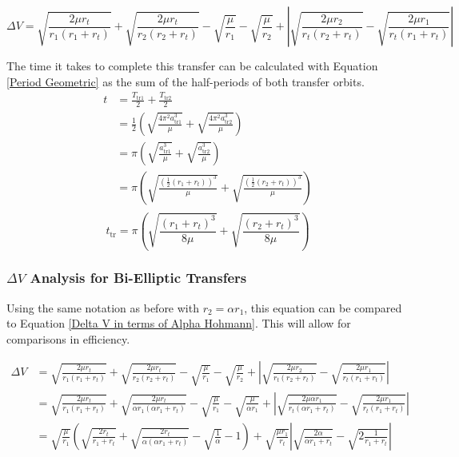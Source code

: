 \documentclass[../main.tex]{subfiles}
\begin{document}
\begin{equation}
    \Delta V = \sqrt{\frac{2\mu r_t}{r_1(r_1+r_t)}}+\sqrt{\frac{2\mu r_t}{r_2(r_2+r_t)}}-\sqrt{\frac{\mu}{r_1}}-\sqrt{\frac{\mu}{r_2}}+\left|\sqrt{\frac{2\mu r_2}{r_t(r_2+r_t)}}-\sqrt{\frac{2\mu r_1}{r_t(r_1+r_t)}}\right|
\end{equation}

The time it takes to complete this transfer can be calculated with Equation \eqref{Period Geometric} as the sum of the half-periods of both transfer orbits.
\begin{align*}
    t & =\frac{T_\text{tr1}}{2}+\frac{T_\text{tr2}}{2}                                                             \\
      & =\frac{1}{2}\left(\sqrt{\frac{4\pi^2 a_\text{tr1}^3}{\mu}}+\sqrt{\frac{4\pi^2 a_\text{tr2}^3}{\mu}}\right) \\
      & =\pi\left(\sqrt{\frac{a_\text{tr1}^3}{\mu}}+\sqrt{\frac{a_\text{tr2}^3}{\mu}}\right)                       \\
      & =\pi\left(\sqrt{\frac{(\frac{1}{2}(r_1+r_t))^3}{\mu}}+\sqrt{\frac{(\frac{1}{2}(r_2+r_t))^3}{\mu}}\right)   \\
\end{align*}
\begin{equation}\label{Bielliptic time}
    t_\text{tr}=\pi\left(\sqrt{\frac{(r_1+r_t)^3}{8\mu}}+\sqrt{\frac{(r_2+r_t)^3}{8\mu}}\right)
\end{equation}

\subsubsection{\texorpdfstring{$\Delta V$}{DeltaV} Analysis for Bi-Elliptic Transfers}

Using the same notation as before with $r_2=\alpha r_1$, this equation can be compared to Equation \eqref{Delta V in terms of Alpha Hohmann}. This will allow for comparisons in efficiency.

\begin{align*}
    \Delta V & = \sqrt{\frac{2\mu r_t}{r_1(r_1+r_t)}}+\sqrt{\frac{2\mu r_t}{r_2(r_2+r_t)}}-\sqrt{\frac{\mu}{r_1}}-\sqrt{\frac{\mu}{r_2}}+\left|\sqrt{\frac{2\mu r_2}{r_t(r_2+r_t)}}-\sqrt{\frac{2\mu r_1}{r_t(r_1+r_t)}}\right|                                    \\
             & = \sqrt{\frac{2\mu r_t}{r_1(r_1+r_t)}}+\sqrt{\frac{2\mu r_t}{\alpha r_1(\alpha r_1+r_t)}}-\sqrt{\frac{\mu}{r_1}}-\sqrt{\frac{\mu}{\alpha r_1}}+\left|\sqrt{\frac{2\mu \alpha r_1}{r_t(\alpha r_1+r_t)}}-\sqrt{\frac{2\mu r_1}{r_t(r_1+r_t)}}\right| \\
             & = \sqrt{\frac{\mu}{r_1}}\left(\sqrt{\frac{2r_t}{r_1+r_t}}+\sqrt{\frac{2r_t}{\alpha(\alpha r_1+r_t)}}-\sqrt{\frac{1}{\alpha}}-1\right)+\sqrt{\frac{\mu r_1}{r_t}}\left|\sqrt{\frac{2\alpha}{\alpha r_1+r_t}}-\sqrt{2\frac{1}{r_1+r_t}}\right|
\end{align*}
\end{document}
